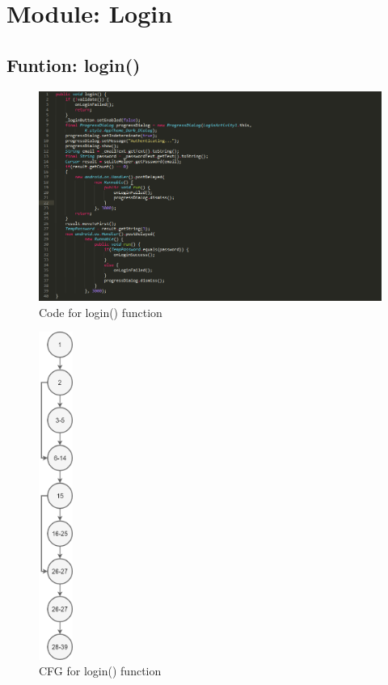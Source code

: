 \documentclass{scrreprt}
\begin{document}
\section{Module: Login}
\subsection{Funtion: login()}
\begin{figure}[H]
\centering
\includegraphics[width=\textwidth, keepaspectratio]{loginCode.png}
\caption{Code for login() function}
\end{figure}

\begin{figure}[H]
\centering
\includegraphics[width=0.1\textwidth, keepaspectratio]{login.png}
\caption{CFG for login() function}
\end{figure}
\end{document}
